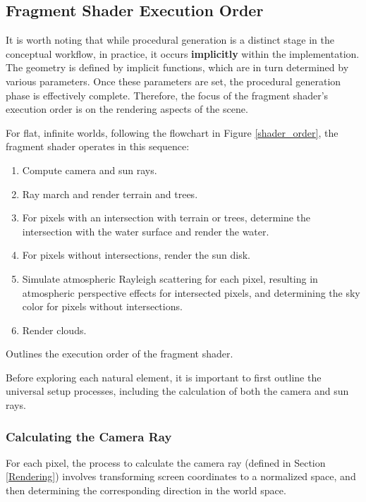 
\subsection{Fragment Shader Execution Order}

It is worth noting that while procedural generation is a distinct stage in the conceptual workflow, in practice, it occurs \textbf{implicitly} within the implementation. The geometry is defined by implicit functions, which are in turn determined by various parameters. Once these parameters are set, the procedural generation phase is effectively complete. Therefore, the focus of the fragment shader’s execution order is on the rendering aspects of the scene.

For flat, infinite worlds, following the flowchart in Figure \ref{shader_order}, the fragment shader operates in this sequence:
\begin{enumerate}
    \item Compute camera and sun rays.
    \item Ray march and render terrain and trees.
    \item For pixels with an intersection with terrain or trees, determine the intersection with the water surface and render the water.
    \item For pixels without intersections, render the sun disk.
    \item Simulate atmospheric Rayleigh scattering for each pixel, resulting in atmospheric perspective effects for intersected pixels, and determining the sky color for pixels without intersections.
    \item Render clouds.
\end{enumerate}

{Outlines the execution order of the fragment shader.}

Before exploring each natural element, it is important to first outline the universal setup processes, including the calculation of both the camera and sun rays.

\subsubsection{Calculating the Camera Ray}

For each pixel, the process to calculate the camera ray (defined in Section \ref{Rendering}) involves transforming screen coordinates to a normalized space, and then determining the corresponding direction in the world space.

